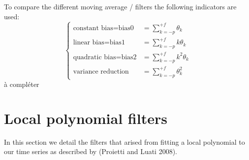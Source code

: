 \documentclass[
  12pt,
  ,
  a4paper]{article}
\newcommand\1{\mathds{1}}
\begin{document}
To compare the different moving average / filters the following indicators are used:
\[
\begin{cases}
  \text{constant bias}=\text{bias0}&= \sum_{k=-p}^{+f} \theta_k\\
  \text{linear bias}=\text{bias1}&=\sum_{k=-p}^{+f} k\theta_k\\
  \text{quadratic bias}=\text{bias2}&=\sum_{k=-p}^{+f} k^2\theta_k\\
  \text{variance reduction}&=\sum_{k=-p}^{+f} \theta_k^2
\end{cases}
\]
à compléter

\hypertarget{local-polynomial-filters}{%
\section{Local polynomial filters}\label{local-polynomial-filters}}

In this section we detail the filters that arised from fitting a local polynomial to our time series as described by (Proietti and Luati 2008).
\end{document}
